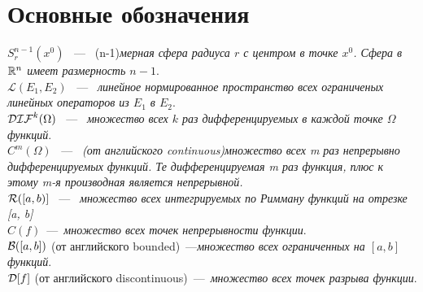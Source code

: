 \section{Основные обозначения}

$S_r^{n-1}(x^0)$ ~---~ (n-1)\textit{мерная сфера радиуса $r$ с центром в точке $x^0$. Сфера в $\mathbb{R}^n$ имеет размерность $n-1$}. \\

$\mathcal{L}(E_1, E_2)$ ~---~ \textit{линейное нормированное пространство всех ограниченых линейных операторов из $E_1$ в $E_2$}. \\

$\mathcal{DIF}^{k} (\Omega)$ ~---~ \textit{множество всех $k$ раз дифференцируемых в каждой точке $\Omega$ функций}. \\

$C^m(\Omega)$ ~---~ \textit{(от английского continuous)множество всех m раз непрерывно дифференцируемых функций. Те дифференцируемая m раз функция, плюс к этому m-я производная является непрерывной. } \\

$\mathcal{R}([a, b)]$ ~---~ \textit{множество всех интегрируемых по Римману функций на отрезке [a, b]} \\

$C(f)$~---~\textit{множество всех точек непрерывности функции}. \\

$\mathcal{B} ([a, b])$ (от английского bounded)~---\textit{множество всех ограниченных на $[a, b]$ функций}. \\


$\mathcal{D}[f]$ (от английского discontinuous)~---~\textit{множество всех точек разрыва функции}. \\

\newpage